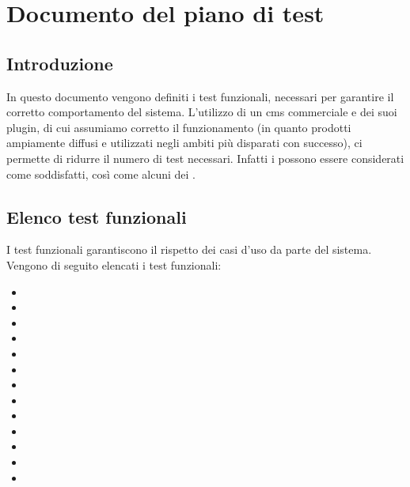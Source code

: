 \chapter{Documento del piano di test}
\section{Introduzione}
In questo documento vengono definiti i test funzionali, necessari per garantire il corretto comportamento del sistema.
L'utilizzo di un \gls{cms} commerciale e dei suoi plugin, di cui assumiamo corretto il funzionamento (in quanto prodotti ampiamente diffusi e utilizzati negli ambiti più disparati con successo), ci permette di ridurre il numero di test necessari.
Infatti i  possono essere considerati come soddisfatti, così come alcuni dei .

\section{Elenco test funzionali}
I test funzionali garantiscono il rispetto dei casi d'uso da parte del sistema.
Vengono di seguito elencati i test funzionali:
\begin{itemize}
	\item {}
	\item {}
	\item {}
	\item {}
	\item {}
	\item {}
	\item {}
	\item {}
	\item {}
	\item {}
	\item {}
	\item {}
	\item {}
\end{itemize}

